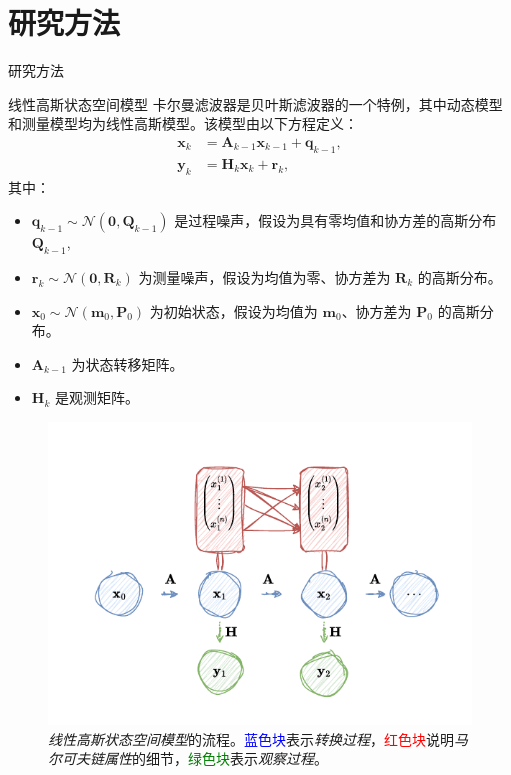 \documentclass[presentation,aspectratio=169]{ctexbeamer}
\begin{document}
\section{研究方法}

\begin{frame}
\Huge{\centerline{\textcolor{covblue}{研究方法}}}
\end{frame}

\begin{frame}{线性高斯状态空间模型}
卡尔曼滤波器是贝叶斯滤波器的一个特例，其中动态模型和测量模型均为线性高斯模型。该模型由以下方程定义：
\begin{align}
\mathbf{x}_k &= \mathbf{A}_{k-1} \mathbf{x}_{k-1} + \mathbf{q}_{k-1}, \\
\mathbf{y}_k &= \mathbf{H}_k \mathbf{x}_k + \mathbf{r}_k,
\end{align}
\pause
其中：
\begin{itemize}
\item \(\mathbf{q}_{k-1} \sim \mathcal{N}(\mathbf{0}, \mathbf{Q}_{k-1})\) 是过程噪声，假设为具有零均值和协方差的高斯分布\(\mathbf{Q}_{k-1}\),
\item \(\mathbf{r}_k \sim \mathcal{N}(\mathbf{0}, \mathbf{R}_k)\) 为测量噪声，假设为均值为零、协方差为 \(\mathbf{R}_k\) 的高斯分布。
\item \(\mathbf{x}_0 \sim \mathcal{N}(\mathbf{m}_0, \mathbf{P}_0)\) 为初始状态，假设为均值为 \(\mathbf{m}_0\)、协方差为 \(\mathbf{P}_0\) 的高斯分布。
\item \(\mathbf{A}_{k-1}\) 为状态转移矩阵。
\item \(\mathbf{H}_k\) 是观测矩阵。
\end{itemize}
\end{frame}

\begin{frame}
\begin{figure}[tb]
\centering
\includegraphics[width=0.75\linewidth]{fig/Markov Chian.pdf}
\caption{\textit{线性高斯状态空间模型}的流程。\textcolor{blue}{蓝色块}表示\textit{转换过程}，\textcolor{red}{红色块}说明\textit{马尔可夫链属性}的细节，\textcolor{green}{绿色块}表示\textit{观察过程}。}
\label{fig: LGSSM 流程图}
\end{figure}
\end{frame}
\end{document}
